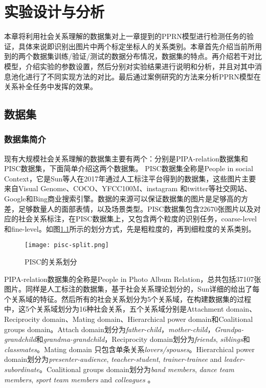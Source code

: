 
\chapter{实验设计与分析}
\label{ch:exp}

本章将利用社会关系理解的数据集对上一章提到的PPRN模型进行检测任务的验证，具体来说即识别出图片中两个标定坐标人的关系类别。本章首先介绍当前所用到的两个数据集训练/验证/测试的数据分布情况，数据集的特点。再介绍若干对比模型，介绍实验的参数设置，然后分别对实验结果进行说明和分析，并且对其中消息池化进行了不同实现方法的对比。最后通过案例研究的方法来分析PPRN模型在关系补全任务中发挥的效果。

\section{数据集}

\subsection{数据集简介}

现有大规模社会关系理解的数据集主要有两个：分别是PIPA-relation\cite{sun2017a}数据集和PISC\cite{li2017dual-glance}数据集，下面简单介绍这两个数据集。
PISC数据集全称是People in social Context，它是Sun等人\cite{sun2017a}在2017年通过人工标注平台得到的数据集，这些图片主要来自Visual Genome\cite{krishna2017visual}、COCO\cite{lin2014microsoft}、YFCC100M\cite{thomee2016yfcc100m:}、instagram 和twitter等社交网站、Google和Bing商业搜索引擎。数据的来源可以保证数据集的图片是足够高的方差，足够数量人的面部表情，以及场景类型。PISC数据集包含22670张图片以及对应的社会关系标注，在PISC数据集上，又包含两个粒度的识别任务，coarse-level和fine-level。如图\ref{fig:exp-pisc-r}所示的划分方式，先是粗粒度的，再到细粒度的关系类别。
\begin{figure}[htpb]
	\centering
	\texttt{[image: pisc-split.png]}
    \caption{PISC的关系划分}
	\vspace*{-3.5mm}
	\label{fig:exp-pisc-r}
\end{figure}

PIPA-relation数据集的全称是People in Photo Album Relation，总共包括37107张图片。同样是人工标注的数据集，基于社会关系理论\cite{bugental2000acquisition}划分的，Sun\cite{sun2017a}详细的给出了每个关系域的特征。然后所有的社会关系划分为5个关系域，在构建数据集的过程中，这5个关系域划分为16种社会关系，五个关系域分别是Attachment domain、Reciprocity domain、Mating domain、Hierarchical power domain和Coalitional groups domain。Attach domain划分为{\it father-child}，{\it mother-child}，{\it Grandpa-grandchild}和{\it grandma-grandchild}，Reciprocity domain划分为{\it friends}, {\it siblings}和{\it classmates}。Mating domain 只包含单条关系{\it lovers/spouses}。Hierarchical power domain划分为{\it presenter-audience}, {\it teacher-student}, {\it trainer-trainee} and {\it leader-subordinate}。Coalitional groups domain划分为{\it band members}, {\it dance team members}, {\it sport team members} and {\it colleagues} 。


